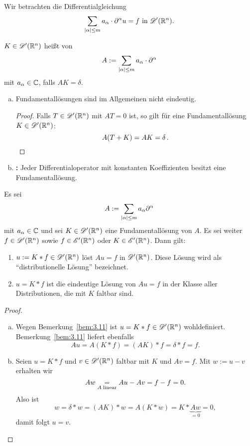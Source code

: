 Wir betrachten die Differentialgleichung 
\[
\sum_{\lvert \alpha\rvert\leq m}a_\alpha\cdot\partial^\alpha u=f \text{ in } \mathscr{D}'(\mathbb{R}^n).
\]

\begin{defi}
  $K\in\mathscr{D}'(\mathbb{R}^n)$ heißt  von
  \[
  A:=\sum_{\lvert \alpha\rvert\leq m}a_\alpha\cdot\partial^\alpha
  \]
  mit $a_\alpha\in\mathbb{C}$, falls $AK=\delta$.
\end{defi}

\begin{bem}
  \label{bem:3.12}
  \begin{enumerate}[(a)]
  \item Fundamentallösungen sind im Allgemeinen nicht eindeutig.
    \begin{proof}
      Falls $T\in\mathscr{D}'(\mathbb{R}^n)$ mit $AT=0$ ist, so gilt für eine Fundamentallösung $K\in\mathscr{D}'(\mathbb{R}^n)$:
      \[
      A(T+K)=AK=\delta \, . \qedhere
      \]
    \end{proof} 

    \item \textbf{:} Jeder Differentialoperator mit konstanten Koeffizienten besitzt eine Fundamentallösung.
  \end{enumerate}
\end{bem}

\begin{theorem}
  \label{theorem:3.13}
  Es sei
  \[ A:=\sum_{\lvert \alpha\rvert\leq m}a_\alpha\partial^\alpha \]
  mit $a_\alpha\in\mathbb{C}$ und sei $K\in\mathscr{D}'(\mathbb{R}^n)$ eine Fundamentallösung von $A$. Es sei weiter $f\in\mathscr{D}'(\mathbb{R}^n)$ sowie $f\in\mathscr{E}'(\mathbb{R}^n)$ oder $K\in\mathscr{E}'(\mathbb{R}^n)$. Dann gilt:
  \begin{enumerate}[\rm (a)]
  \item $u:=K\ast f\in\mathscr{D}'(\mathbb{R}^n)$ löst $Au=f$ in $\mathscr{D}'(\mathbb{R}^n)$. Diese Lösung wird als "`distributionelle Lösung"' bezeichnet.
  \item $u=K\ast f$ ist die eindeutige Lösung von $Au=f$ in der Klasse aller Distributionen, die mit $K$ faltbar sind.
  \end{enumerate}
\end{theorem}

\begin{proof}
  \begin{enumerate}[(a)]
  \item Wegen Bemerkung~\ref{bem:3.11} ist $u=K\ast f\in\mathscr{D}'(\mathbb{R}^n)$ wohldefiniert. Bemerkung~\ref{bem:3.11} liefert ebenfalls
    \[ Au=A(K\ast f)=(AK)\ast f=\delta\ast f=f. \]
  \item Seien $u=K\ast f$ und $v\in\mathscr{D}'(\mathbb{R}^n)$ faltbar mit $K$ und $Av=f$. Mit $w:=u-v$ erhalten wir
    \[ Aw\underset{A\;\scriptsize\text{linear}}=Au-Av=f-f=0. \]
    Also ist
    \[ w=\delta\ast w=(AK)\ast w=A(K\ast w)=K\ast \underbrace{Aw}_{=0}=0, \]
    damit folgt $u = v$.\qedhere
  \end{enumerate}
\end{proof}

